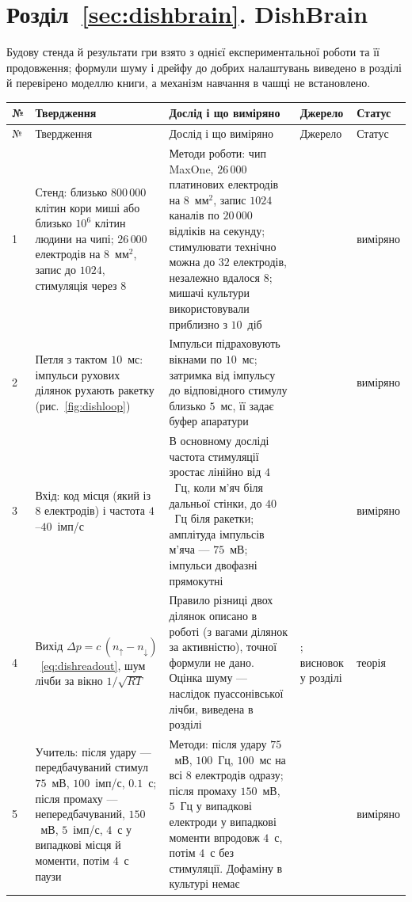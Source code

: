 \section{Розділ~\ref{sec:dishbrain}. DishBrain}

Будову стенда й результати гри взято з однієї експериментальної роботи та її продовження; формули шуму і дрейфу до добрих налаштувань виведено в розділі й перевірено моделлю книги, а механізм навчання в чашці не встановлено.

{\footnotesize
\setlength{\tabcolsep}{3pt}\renewcommand{\arraystretch}{1.15}
\begin{longtable}{>{\raggedright}p{0.5cm}>{\raggedright}p{4.0cm}>{\raggedright}p{5.6cm}>{\raggedright}p{2.3cm}>{\raggedright\arraybackslash}p{1.7cm}}
\toprule
№ & Твердження & Дослід і що виміряно & Джерело & Статус \\
\midrule\endfirsthead
\toprule
№ & Твердження & Дослід і що виміряно & Джерело & Статус \\
\midrule\endhead
1 & Стенд: близько $800\,000$ клітин кори миші або близько $10^6$ клітин людини на чипі; $26\,000$ електродів на $8$~мм$^2$, запис до $1024$, стимуляція через $8$ & Методи роботи: чип MaxOne, $26\,000$ платинових електродів на $8$~мм$^2$, запис $1024$ каналів по $20\,000$ відліків на секунду; стимулювати технічно можна до $32$ електродів, незалежно вдалося $8$; мишачі культури використовували приблизно з $10$~діб & \cite{Kagan2022} & виміряно \\
2 & Петля з тактом $10$~мс: імпульси рухових ділянок рухають ракетку (рис.~\ref{fig:dishloop}) & Імпульси підраховують вікнами по $10$~мс; затримка від імпульсу до відповідного стимулу близько $5$~мс, її задає буфер апаратури & \cite{Kagan2022} & виміряно \\
3 & Вхід: код місця (який із $8$ електродів) і частота $4$--$40$~імп/с & В основному досліді частота стимуляції зростає лінійно від $4$~Гц, коли м'яч біля дальньої стінки, до $40$~Гц біля ракетки; амплітуда імпульсів м'яча --- $75$~мВ; імпульси двофазні прямокутні & \cite{Kagan2022} & виміряно \\
4 & Вихід $\Delta p=c\,(n_\uparrow-n_\downarrow)$~\eqref{eq:dishreadout}, шум лічби за вікно $1/\sqrt{RT}$ & Правило різниці двох ділянок описано в роботі (з вагами ділянок за активністю), точної формули не дано. Оцінка шуму --- наслідок пуассонівської лічби, виведена в розділі & \cite{Kagan2022}; висновок у розділі & теорія \\
5 & Учитель: після удару --- передбачуваний стимул $75$~мВ, $100$~імп/с, $0.1$~с; після промаху --- непередбачуваний, $150$~мВ, $5$~імп/с, $4$~с у випадкові місця й моменти, потім $4$~с паузи & Методи: після удару $75$~мВ, $100$~Гц, $100$~мс на всі $8$ електродів одразу; після промаху $150$~мВ, $5$~Гц у випадкові електроди у випадкові моменти впродовж $4$~с, потім $4$~с без стимуляції. Дофаміну в культурі немає & \cite{Kagan2022} & виміряно \\

\end{longtable}}
